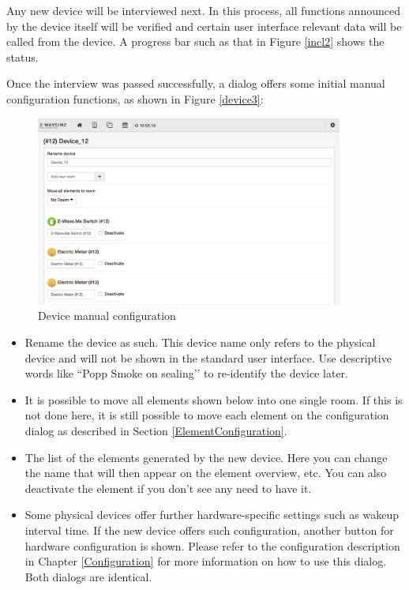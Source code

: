Any new device will be interviewed next. In this process, all functions announced by 
the device itself will be verified and certain user interface relevant data will be called 
from the device. A progress bar such as that in Figure \ref{incl2} shows the status.

Once the interview was passed successfully, a dialog offers some initial manual configuration 
functions, as shown in Figure \ref{device3}:

\begin{figure}
\begin{center}
\includegraphics[width=0.9\textwidth]{pngs/cap4/incl3.png}
\caption{\zwave Device manual configuration}
\label{incl3}
\end{center}
\end{figure}

\begin{itemize}
\item Rename the device as such. This device name only refers to the physical device and 
will not be shown in the standard user interface. Use descriptive words 
like ``Popp Smoke on sealing’’ to re-identify the device later.
\item It is possible to move all elements shown below into one single room. If this is not 
done here, it is still possible to move each element on the configuration dialog as 
described in Section \ref{ElementConfiguration}.
\item The list of the elements generated by the new device. Here you can change the name 
that will then appear on the element overview, etc. You can also deactivate the element 
if you don’t see any need to have it.
\item Some physical devices offer further hardware-specific settings such as wakeup interval 
time. If the new device offers such configuration, another button for hardware 
configuration is shown. Please refer to the \zweui 
configuration description in Chapter \ref{Configuration} for more information on how to 
use this dialog. Both dialogs are identical.
\end{itemize}

